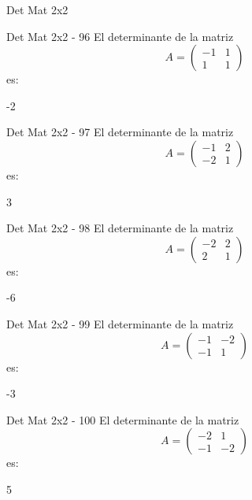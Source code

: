 \documentclass[a4,11pt]{aleph-notas}
\begin{document}
\begin{quiz}{Det Mat 2x2}
\begin{numerical}[tolerance=0]%
    {Det Mat 2x2 - 96}
    El determinante de la matriz
    \[
        A = \begin{pmatrix} -1 & 1 \\ 1 & 1 \end{pmatrix}
    \]
    es:
    \item[] -2
\end{numerical}

\begin{numerical}[tolerance=0]%
    {Det Mat 2x2 - 97}
    El determinante de la matriz
    \[
        A = \begin{pmatrix} -1 & 2 \\ -2 & 1 \end{pmatrix}
    \]
    es:
    \item[] 3
\end{numerical}

\begin{numerical}[tolerance=0]%
    {Det Mat 2x2 - 98}
    El determinante de la matriz
    \[
        A = \begin{pmatrix} -2 & 2 \\ 2 & 1 \end{pmatrix}
    \]
    es:
    \item[] -6
\end{numerical}

\begin{numerical}[tolerance=0]%
    {Det Mat 2x2 - 99}
    El determinante de la matriz
    \[
        A = \begin{pmatrix} -1 & -2 \\ -1 & 1 \end{pmatrix}
    \]
    es:
    \item[] -3
\end{numerical}

\begin{numerical}[tolerance=0]%
    {Det Mat 2x2 - 100}
    El determinante de la matriz
    \[
        A = \begin{pmatrix} -2 & 1 \\ -1 & -2 \end{pmatrix}
    \]
    es:
    \item[] 5
\end{numerical}




\end{quiz}
\end{document}
